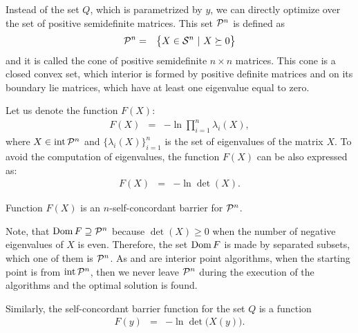 Instead of the set $Q$, which is parametrized by $y$, we can directly optimize over the set of positive semidefinite matrices. This set $\mathcal{P}^n$ is defined as
\begin{eqnarray}
  \mathcal{P}^n &=& \big\{X\in\mathcal{S}^n\ |\ X\succeq0\big\}
\end{eqnarray}
and it is called the cone of positive semidefinite $n\times n$ matrices. This cone is a closed convex set, which interior is formed by positive definite matrices and on its boundary lie matrices, which have at least one eigenvalue equal to zero.

Let us denote the function $F(X)$:
\begin{eqnarray}
  F(X) &=& -\ln\prod_{i=1}^{n}\lambda_i(X),
\end{eqnarray}
where $X\in\operatorname{int}\mathcal{P}^n$ and $\big\{\lambda_i(X)\big\}_{i=1}^n$ is the set of eigenvalues of the matrix $X$.
To avoid the computation of eigenvalues, the function $F(X)$ can be also expressed as:
\begin{eqnarray}
  F(X) &=& -\ln\det(X).
\end{eqnarray}

\begin{theorem}
  Function $F(X)$ is an $n$-self-concordant barrier for $\mathcal{P}^n$.
\end{theorem}

Note, that $\operatorname{Dom} F \supseteq \mathcal{P}^n$ because $\det(X) \geq 0$ when the number of negative eigenvalues of $X$ is even. Therefore, the set $\operatorname{Dom} F$ is made by separated subsets, which one of them is $\mathcal{P}^n$. As  and  are interior point algorithms, when the starting point is from $\operatorname{int}\mathcal{P}^n$, then we never leave $\mathcal{P}^n$ during the execution of the algorithms and the optimal solution is found.

Similarly, the self-concordant barrier function for the set $Q$ is a function 
\begin{eqnarray}
  F(y) &=& -\ln\det\big(X(y)\big).
\end{eqnarray}

